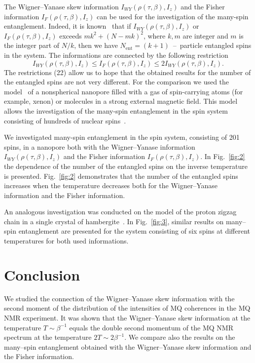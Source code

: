 \documentclass[preprint,12pt]{elsarticle}
\begin{document}
The Wigner--Yanase skew information $I_{WY}(\rho(\tau,\beta),I_z)$ and the Fisher information $I_F(\rho(\tau,\beta),I_z)$ can be used for the investigation of the many-spin entanglement.
Indeed, it is known~\cite{5,6} that if
$I_{WY}\left( \rho(\tau, \beta), I_z \right)$
or
$I_{F}\left( \rho(\tau, \beta), I_z \right)$
exceeds $mk^2 + (N - mk)^2$,
where $k, m$ are integer and $m$ is the integer part of $N/k$,
then we have $N_\mathrm{ent} = (k + 1) $~--~particle entangled spins in the system.
The informations are connected by the following restriction~\cite{3}
%
\begin{equation} \label{eq:22}
    I_{WY}\left(\rho(\tau,\beta), I_z\right)
    \leq I_F\left(\rho(\tau,\beta), I_z\right)
    \leq 2I_{WY}\left(\rho(\tau,\beta), I_z\right).
\end{equation}
%
The restrictions (22) allow us to hope that the obtained results for the number of the entangled spins are not very different.
For the comparison we used the model~\cite{23} of a nonspherical nanopore filled with a gas of spin-carrying atoms (for example, xenon) or molecules in a strong external magnetic field.
This model allows the investigation of the many-spin entanglement in the spin system consisting of hundreds of nuclear spins~\cite{8}.


We investigated many-spin entanglement in the spin system, consisting of 201 spins, in a nanopore both with
the Wigner--Yanase information $I_{WY}\left(\rho(\tau, \beta), I_z\right)$
and the Fisher information $I_F\left(\rho(\tau,\beta),I_z\right)$.
In Fig.~\ref{fig:2} the dependence of the number of the entangled spins on the inverse temperature is presented.
Fig.~\ref{fig:2} demonstrates that the number of the entangled spins increases when the temperature decreases both for the Wigner--Yanase information and the Fisher information.


An analogous investigation was conducted on the model of the proton zigzag chain in a single crystal of hambergite~\cite{16,24}.
In Fig.~\ref{fig:3},  similar results on many--spin entanglement are presented for the system consisting of six spins at different temperatures for both used informations.


\section{Conclusion}
\label{sec:5}

We studied the connection of the Wigner--Yanase skew information with the second moment of the distribution of the intensities of MQ coherences in the MQ NMR experiment.
It was shown that the Wigner--Yanase skew information at the temperature $T \sim \beta^{-1}$ equals the double second momentum of the MQ NMR spectrum at the temperature $2T \sim 2\beta^{-1}$.
We compare also the results on the many--spin entanglement obtained with the Wigner--Yanase skew information and the Fisher information.
\end{document}
